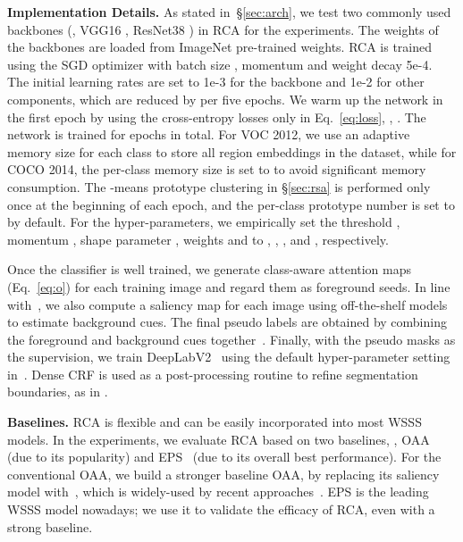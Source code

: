 \documentclass[10pt,twocolumn,letterpaper]{article}
\begin{document}
\noindent\textbf{Implementation Details.} As stated in~\S\ref{sec:arch}, we test two commonly used backbones (\ie, VGG16 \cite{simonyan2014very}, ResNet38 \cite{he2016deep}) in RCA for the experiments. The weights of the backbones are loaded from ImageNet pre-trained weights. RCA is trained using the SGD optimizer with batch size {}, momentum {} and weight decay 5e-4. The initial learning rates are set to 1e-3 for the backbone and 1e-2 for other components, which are reduced by  per five epochs. We warm up the network in the first epoch by  using the cross-entropy losses only in Eq.~\ref{eq:loss}, \ie, . The network is trained  for  epochs in total.  For VOC 2012, we use an adaptive memory size for each class to store all region embeddings in the dataset, while for COCO 2014, the per-class memory size is set to  to avoid significant memory consumption. The -means prototype clustering in \S\ref{sec:rsa} is performed only once at the beginning of each epoch, and the per-class  prototype number is set to  by default. For the hyper-parameters, we empirically set the threshold ,  momentum , shape parameter ,  weights  and  to {}, {}, ,  and {}, respectively. 


Once the classifier is well trained, we generate class-aware attention maps  (Eq.~\ref{eq:o}) for each training image and regard them as foreground seeds. In line with~\cite{wu2021embedded,xu2021leveraging,lee2021railroad,jiang2019integral,li2021group}, we also compute a saliency map for each image using off-the-shelf models to estimate background cues. The final pseudo labels are obtained by combining the foreground and background cues together~\cite{jiang2019integral,li2021group}. Finally, with the pseudo masks as the supervision, we train  DeepLabV2~\cite{chen2017deeplab} using  the default hyper-parameter setting in~\cite{chen2017deeplab}. Dense CRF \cite{krahenbuhl2011efficient} is used as a post-processing routine to refine segmentation boundaries, as in \cite{lee2021railroad,wu2021embedded,li2021pseudo,xu2021leveraging,zhang2021complementary}.





\noindent\textbf{Baselines.} 
RCA is flexible and can be easily incorporated into most  WSSS models. In the experiments, we evaluate RCA based on two baselines, \ie, OAA~\cite{jiang2019integral} (due to its popularity) and EPS~\cite{lee2021railroad} (due to its overall best performance). For the conventional OAA, we build a stronger baseline OAA, by replacing its  saliency model with~\cite{liu2019simple}, which is widely-used by recent approaches~\cite{wu2021embedded,xu2021leveraging}.  EPS is the leading WSSS model nowadays; we use it to validate the efficacy of RCA, even with a strong baseline. 
\end{document}
